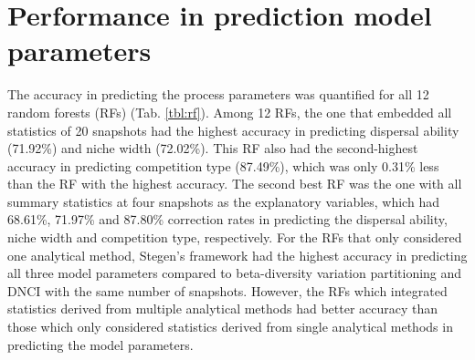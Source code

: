 %


\section{Performance in prediction model parameters}
\noindent
The accuracy in predicting the process parameters was quantified for all 12 random forests (RFs) (Tab. \ref{tbl:rf}). Among 12 RFs, the one that embedded all statistics of 20 snapshots had the highest accuracy in predicting dispersal ability (71.92\%) and niche width (72.02\%). This RF also had the second-highest accuracy in predicting competition type (87.49\%), which was only 0.31\% less than the RF with the highest accuracy. The second best RF was the one with all summary statistics at four snapshots as the explanatory variables, which had 68.61\%, 71.97\% and 87.80\% correction rates in predicting the dispersal ability, niche width and competition type, respectively. For the RFs that only considered one analytical method, Stegen's framework had the highest accuracy in predicting all three model parameters compared to beta-diversity variation partitioning and DNCI with the same number of snapshots. However, the RFs which integrated statistics derived from multiple analytical methods had better accuracy than those which only considered statistics derived from single analytical methods in predicting the model parameters.

